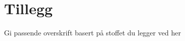 \appendix

\section{Tillegg}
\label{ekstraGreier}
Gi passende overskrift basert på stoffet du legger ved her
